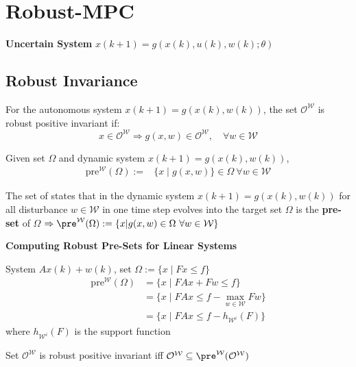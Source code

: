 \section{Robust-MPC}

\textbf{Uncertain System}
$x(k+1) = g(x(k), u(k), w(k); \theta)$


\subsection{Robust Invariance}

\begin{definition}
	For the autonomous system
	$x(k+1)=g(x(k),w(k))$,
	the set $\mathcal{O}^\mathcal{W}$
	is robust positive invariant
	if:
	\[
		x\in\mathcal{O}^\mathcal{W}\Rightarrow
		g(x,w) \in \mathcal{O}^\mathcal{W},
		\quad \forall w \in \mathcal{W}
	\]
\end{definition}

Given set $\Omega$ and dynamic system $x(k+1) = g(x(k), w(k))$,
\begin{align*}
	\mathrm{pre}^{\mathcal{W}}(\Omega) := & \{x \mid g(x,w)\} \in \Omega \ \forall w \in \mathcal{W}
\end{align*}

\begin{definition}
	The set of states that
	in the dynamic system $x(k+1) = g(x(k),w(k))$
	for all disturbance $w\in\mathcal{W}$
	in one time step evolves into the target set $\Omega$
	is the \textbf{pre-set} of $\Omega$
	$\Rightarrow \pre^\mathcal{W}(\Omega) :=
		\{x|g(x,w)\in \Omega\ \forall w\in\mathcal{W}\}$
\end{definition}

\textbf{Computing Robust Pre-Sets for Linear Systems}

System $Ax(k) + w(k)$, set $\Omega:= \{x \mid Fx \leq f\}$
\begin{align*}
	\mathrm{pre}^{\mathcal{W}}(\Omega)
	 & = \{ x \mid FAx + Fw \leq f\}
	\\
	 & = \{ x \mid FAx \leq f- \max_{w\in\mathcal{W}}Fw \}
	\\
	 & = \{ x \mid FAx \leq f -  h_{\mathcal{W}^i}(F) \}
\end{align*}
%
where $h_{\mathcal{W}^i}(F)$ is the support function

\begin{theorem}
	Set $\mathcal{O}^\mathcal{W}$
	is robust positive invariant iff
	$\mathcal{O}^\mathcal{W} \subseteq
		\pre^\mathcal{W}(\mathcal{O}^\mathcal{W})$
\end{theorem}

